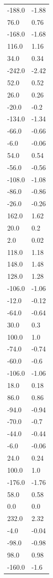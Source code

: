 \begin{longtable}{ll}
-188.0 & -1.88 \\
76.0 & 0.76 \\
-168.0 & -1.68 \\
116.0 & 1.16 \\
34.0 & 0.34 \\
-242.0 & -2.42 \\
52.0 & 0.52 \\
26.0 & 0.26 \\
-20.0 & -0.2 \\
-134.0 & -1.34 \\
-66.0 & -0.66 \\
-6.0 & -0.06 \\
54.0 & 0.54 \\
-56.0 & -0.56 \\
-108.0 & -1.08 \\
-86.0 & -0.86 \\
-26.0 & -0.26 \\
162.0 & 1.62 \\
20.0 & 0.2 \\
2.0 & 0.02 \\
118.0 & 1.18 \\
148.0 & 1.48 \\
128.0 & 1.28 \\
-106.0 & -1.06 \\
-12.0 & -0.12 \\
-64.0 & -0.64 \\
30.0 & 0.3 \\
100.0 & 1.0 \\
-74.0 & -0.74 \\
-60.0 & -0.6 \\
-106.0 & -1.06 \\
18.0 & 0.18 \\
86.0 & 0.86 \\
-94.0 & -0.94 \\
-70.0 & -0.7 \\
-44.0 & -0.44 \\
-6.0 & -0.06 \\
24.0 & 0.24 \\
100.0 & 1.0 \\
-176.0 & -1.76 \\
58.0 & 0.58 \\
0.0 & 0.0 \\
232.0 & 2.32 \\
-4.0 & -0.04 \\
-98.0 & -0.98 \\
98.0 & 0.98 \\
-160.0 & -1.6 \\

\end{longtable}
